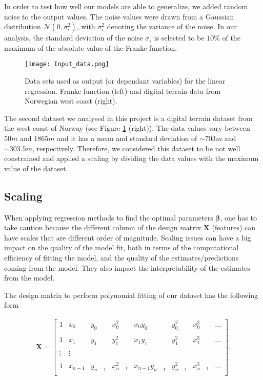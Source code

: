 \documentclass[a4paper]{article}
\begin{document}
In order to test how well our models are able to generalize, we added random noise to the output values. The noise values were drawn from a Gaussian distribution $\mathcal{N}(0,\sigma_{\epsilon}^2)$, with $\sigma_{\epsilon}^2$ denoting the variance of the noise. In our analysis, the standard deviation of the noise $\sigma_{\epsilon}$ is selected to be $10\%$ of the maximum of the absolute value of the Franke function.

\begin{figure}[H]
  \centering
  \texttt{[image: Input\_data.png]}
  \caption{Data sets used as output (or dependant variables) for the linear regression. Franke function (left) and digital terrain data from Norwegian west coast (right).}
    \label{Input_data}
\end{figure}

The second dataset we analysed in this project is a digital terrain dataset from the west coast of Norway (see Figure \ref{Input_data} (right)). The data values vary between $50 m$ and $1865 m$ and it has a mean and standard deviation of $\sim703 m$ and $\sim303.5 m$, respectively. Therefore, we considered this dataset to be not well constrained and applied a scaling by dividing the data values with the maximum value of the dataset.

\subsection{Scaling}
When applying regression methods to find the optimal parameters $\mathbf{\beta}$, one has to take caution because the different column of the design matrix $\mathbf{X}$ (features) can have scales that are different order of magnitude. Scaling issues can have a big impact on the quality of the model fit, both in terms of the computational efficiency of fitting the model, and the quality of the estimates/predictions coming from the model. They also impact the interpretability of the estimates from the model. 

The design matrix to perform polynomial fitting of our dataset has the following form

\begin{align}
    \mathbf{X}= 
    \begin{bmatrix} 
    1 & x_0 & y_0 & x_0^2 & x_0 y_0 & y_0^2 & x_0^3 & \dots \\
    \\
    1 & x_1 & y_1  & y_1^2 & x_1 y_1   &  y_1^2  & x_1^3   & \dots \\
    \\
    \vdots & \vdots \\
    \\
    1 & x_{n-1} & y_{n-1} & x_{n-1}^2 & x_{n-1} y_{n-1} & y_{n-1}^2 & x_{n-1}^3 & \dots \\
    \end{bmatrix}.
    \label{_auto1} 
\end{align}
\end{document}
